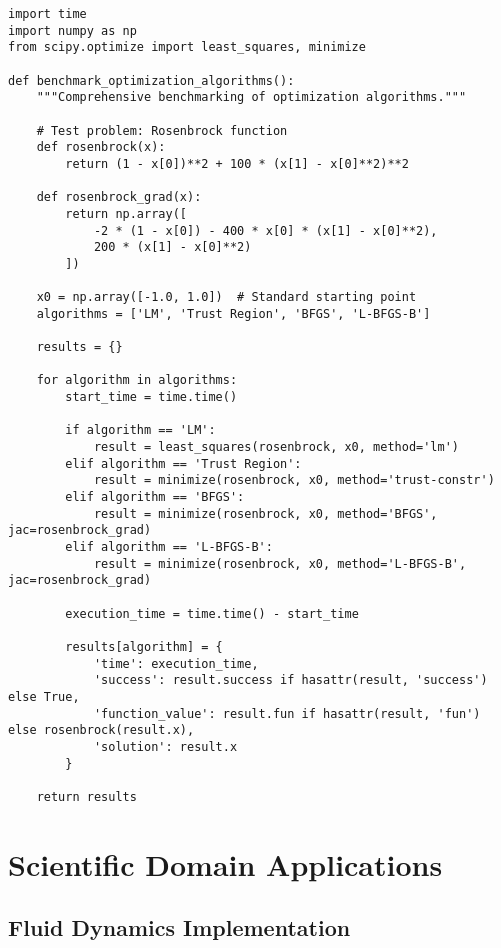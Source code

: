 \documentclass[11pt,a4paper]{article}
\begin{document}
\begin{lstlisting}[caption=Performance Benchmarking Implementation]
import time
import numpy as np
from scipy.optimize import least_squares, minimize

def benchmark_optimization_algorithms():
    """Comprehensive benchmarking of optimization algorithms."""

    # Test problem: Rosenbrock function
    def rosenbrock(x):
        return (1 - x[0])**2 + 100 * (x[1] - x[0]**2)**2

    def rosenbrock_grad(x):
        return np.array([
            -2 * (1 - x[0]) - 400 * x[0] * (x[1] - x[0]**2),
            200 * (x[1] - x[0]**2)
        ])

    x0 = np.array([-1.0, 1.0])  # Standard starting point
    algorithms = ['LM', 'Trust Region', 'BFGS', 'L-BFGS-B']

    results = {}

    for algorithm in algorithms:
        start_time = time.time()

        if algorithm == 'LM':
            result = least_squares(rosenbrock, x0, method='lm')
        elif algorithm == 'Trust Region':
            result = minimize(rosenbrock, x0, method='trust-constr')
        elif algorithm == 'BFGS':
            result = minimize(rosenbrock, x0, method='BFGS', jac=rosenbrock_grad)
        elif algorithm == 'L-BFGS-B':
            result = minimize(rosenbrock, x0, method='L-BFGS-B', jac=rosenbrock_grad)

        execution_time = time.time() - start_time

        results[algorithm] = {
            'time': execution_time,
            'success': result.success if hasattr(result, 'success') else True,
            'function_value': result.fun if hasattr(result, 'fun') else rosenbrock(result.x),
            'solution': result.x
        }

    return results
\end{lstlisting}

\section{Scientific Domain Applications}

\subsection{Fluid Dynamics Implementation}
\end{document}
